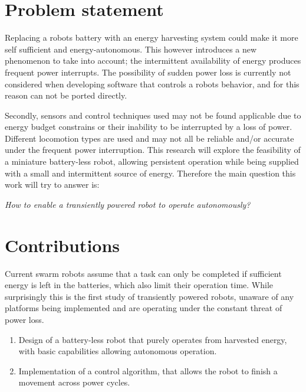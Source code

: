 \newpage

\section{Problem statement}



Replacing a robots battery with an energy harvesting system could make it more self sufficient and energy-autonomous. 
This however introduces a new phenomenon to take into account; the intermittent availability of energy produces frequent power interrupts.
The possibility of sudden power loss is currently not considered when developing software that controls a robots behavior, and for this reason can not be ported directly.
\hfill \break

Secondly, sensors and control techniques used may not be found applicable due to energy budget constrains or their inability to be interrupted by a loss of power. 
Different locomotion types are used and may not all be reliable and/or accurate under the frequent power interruption.
This research will explore the feasibility of a miniature battery-less robot, allowing persistent operation while being supplied with a small and intermittent source of energy.
Therefore the main question this work will try to answer is:

\begin{center}
	\textit{How to enable a transiently powered robot to operate autonomously?}
\end{center}

\section{Contributions}
Current swarm robots assume that a task can only be completed if sufficient energy is left in the batteries, which also limit their operation time. 
While surprisingly this is the first study of transiently powered robots, unaware of any platforms being implemented and are operating under the constant threat of power loss. 

\begin{enumerate}


\item Design of a battery-less robot that purely operates from harvested energy, with basic capabilities allowing autonomous operation.

\item Implementation of a control algorithm, that allows the robot to finish a movement across power cycles.



\end{enumerate}


